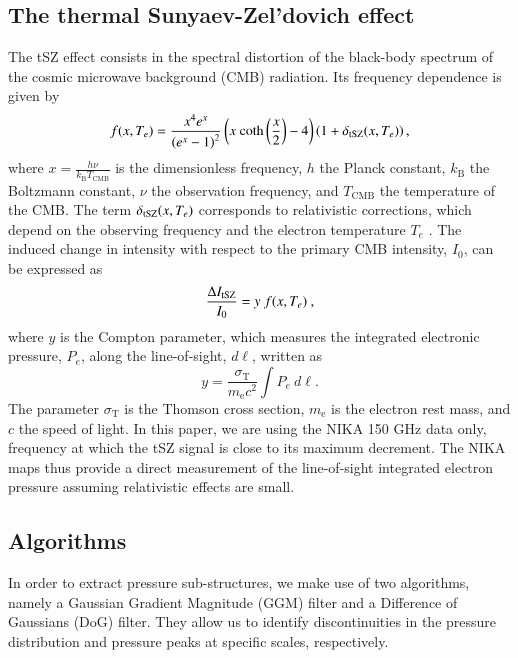 \documentclass[twocolumn,traditabstract]{aa}
\begin{document}
\subsection{The thermal Sunyaev-Zel'dovich effect}
The tSZ effect consists in the spectral distortion of the black-body spectrum of the cosmic microwave background (CMB) radiation. Its frequency dependence is given by \citep{birkinshaw1999}
\begin{equation}
	f(x, T_e) = \frac{x^4 e^x}{\left(e^x-1\right)^2} \left(x  \ \mathrm{coth}\left(\frac{x}{2}\right) - 4\right) \left( 1 + \delta_{\rm tSZ}(x, T_e) \right), 
	\label{eq:sz_f_x}
\end{equation}
where $x = \frac{h \nu}{k_{\mathrm{B}} T_{\mathrm{CMB}}}$ is the dimensionless frequency, $h$ the Planck constant, $k_{\mathrm{B}}$ the Boltzmann constant, $\nu$ the observation frequency, and $T_{\mathrm{CMB}}$ the temperature of the CMB. The term $\delta_{\rm tSZ}(x,T_e)$ corresponds to relativistic corrections, which depend on the observing frequency and the electron temperature $T_e$ \citep[see, e.g.][]{Itoh2003}. The induced change in intensity with respect to the primary CMB intensity, $I_0$, can be expressed as
\begin{equation}
	\frac{\Delta I_{\rm tSZ}}{I_0} = y \ f(x, T_e) \ ,
\label{eq:deltaI}
\end{equation}
where $y$ is the Compton parameter, which measures the integrated electronic pressure, $P_{e}$, along the line-of-sight, $d\ell$, written as
   \begin{equation}
	y = \frac{\sigma_{\mathrm{T}}}{m_{\mathrm{e}} c^2} \int P_{e} \ d\ell.
	\label{eq:y_compton}
   \end{equation}
The parameter $\sigma_{\mathrm{T}}$ is the Thomson cross section, $m_{\mathrm{e}}$ is the electron rest mass, and $c$ the speed of light. In this paper, we are using the NIKA 150 GHz data only, frequency at which the tSZ signal is close to its maximum decrement. The NIKA maps thus provide a direct measurement of the line-of-sight integrated electron pressure assuming relativistic effects are small.

\subsection{Algorithms}\label{sec:Algorithms}
In order to extract pressure sub-structures, we make use of two algorithms, namely a Gaussian Gradient Magnitude (GGM) filter and a Difference of Gaussians (DoG) filter. They allow us to identify discontinuities in the pressure distribution and pressure peaks at specific scales, respectively.
\end{document}
